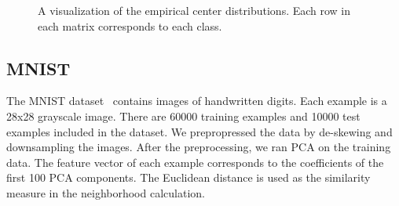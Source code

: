 \documentclass{article}
\begin{document}
\begin{figure}[hb]
\vskip 0.2in
\begin{center}
\centering
{}
\caption{A visualization of the empirical center distributions. Each row
  in each matrix corresponds to each class. }
\label{fig:matrix}
\end{center}
\vskip -0.2in
\end{figure}


\subsection{MNIST}
The MNIST dataset~\cite{Lecun1998} contains images of handwritten
digits. Each example is a 28x28 grayscale image. There are 60000
training examples and 10000 test examples included in the dataset. We
prepropressed the data by de-skewing and downsampling the images. After
the preprocessing, we ran PCA on the training data. The feature vector
of each example corresponds to the coefficients of the first 100 PCA
components. The Euclidean distance is used as the similarity measure
in the neighborhood calculation.
\end{document}
